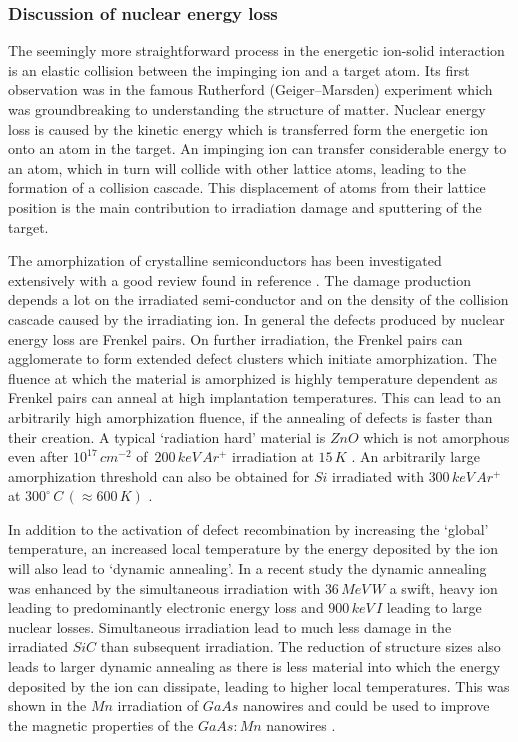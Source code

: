 \subsubsection{Discussion of nuclear energy loss}

The seemingly more straightforward process in the energetic ion-solid interaction is an elastic collision between the impinging ion and a target atom. Its first observation was in the famous Rutherford (Geiger–Marsden) experiment \cite{rutherford_scattering_1911} which was groundbreaking to understanding the structure of matter. Nuclear energy loss is caused by the kinetic energy which is transferred form the energetic ion onto an atom in the target. An impinging ion can transfer considerable energy to an atom, which in turn will collide with other lattice atoms, leading to the formation of a collision cascade. This displacement of atoms from their lattice position is the main contribution to irradiation damage and sputtering of the target. 

The amorphization of crystalline semiconductors has been investigated extensively with a good review found in reference \cite{wesch_damage_2012}. The damage production depends a lot on the irradiated semi-conductor and on the density of the collision cascade caused by the irradiating ion. In general the defects produced by nuclear energy loss are Frenkel pairs. On further irradiation, the Frenkel pairs can agglomerate to form extended defect clusters which initiate amorphization. The fluence at which the material is amorphized is highly temperature dependent as Frenkel pairs can anneal at high implantation temperatures. This can lead to an arbitrarily high amorphization fluence, if the annealing of defects is faster than their creation. A typical `radiation hard' material is $ZnO$ which is not amorphous even after $10^{17}\,cm^{-2}$ of $\,200\,keV\,Ar^+$ irradiation at $15\,K$ \cite{wesch_damage_2012}. An arbitrarily large amorphization threshold can also be obtained for $Si$ irradiated with $300\,keV\,Ar^+$ at $300^\circ\,C\,(\approx 600\,K)$ \cite{pelaz_ion-beam-induced_2004}.

In addition to the activation of defect recombination by increasing the `global' temperature, an increased local temperature by the energy deposited by the ion will also lead to `dynamic annealing'. In a recent study \cite{thome_recovery_2015} the dynamic annealing was enhanced by the simultaneous irradiation with $36\,MeV\,W$ a swift, heavy ion leading to predominantly electronic energy loss and $900\,keV\,I$ leading to large nuclear losses. Simultaneous irradiation lead to much less damage in the irradiated $SiC$ than subsequent irradiation. The reduction of structure sizes also leads to larger dynamic annealing as there is less material into which the energy deposited by the ion can dissipate, leading to higher local temperatures. This was shown in the $Mn$ irradiation of $GaAs$ nanowires \cite{borschel_ion-solid_2012,johannes_ion_2015} and could be used to improve the magnetic properties of the $GaAs:Mn$ nanowires \cite{borschel_new_2011,paschoal_hopping_2012,kumar_magnetic_2013,paschoal_magnetoresistance_2014}. 

